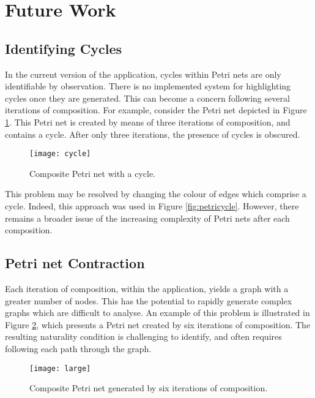 \documentclass[../Dissertation.tex]{subfiles}
\begin{document}
\section{Future Work}

\subsection{Identifying Cycles}
In the current version of the application, cycles within Petri nets are only identifiable by observation. There is no implemented system for highlighting cycles once they are generated. This can become a concern following several iterations of composition. For example, consider the Petri net depicted in Figure \ref{fig:cycle}. This Petri net is created by means of three iterations of composition, and contains a cycle. After only three iterations, the presence of cycles is obscured.

\begin{figure}[H]
\begin{center}
\texttt{[image: cycle]}
\end{center}
\caption{Composite Petri net with a cycle.}
\label{fig:cycle}
\end{figure}

This problem may be resolved by changing the colour of edges which comprise a cycle. Indeed, this approach was used in Figure \ref{fig:petricycle}. However, there remains a broader issue of the increasing complexity of Petri nets after each composition.

\subsection{Petri net Contraction}
Each iteration of composition, within the application, yields a graph with a greater number of nodes. This has the potential to rapidly generate complex graphs which are difficult to analyse. An example of this problem is illustrated in Figure \ref{fig:large}, which presents a Petri net created by six iterations of composition. The resulting naturality condition is challenging to identify, and often requires following each path through the graph.

\begin{figure}[H]
\begin{center}
\texttt{[image: large]}
\end{center}
\caption{Composite Petri net generated by six iterations of composition.}
\label{fig:large}
\end{figure}
\end{document}
